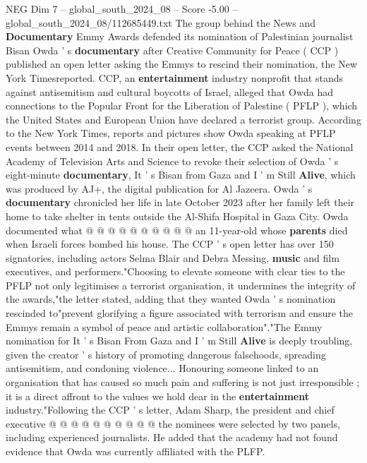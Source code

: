\begin{textsample}{NEG Dim 7 – global\_south\_2024\_08 – Score -5.00 – global\_south\_2024\_08/112685449.txt}  \label{ex:f7_neg_373}
The group behind the News and \textbf{Documentary} Emmy Awards defended its nomination of Palestinian journalist Bisan Owda ' s \textbf{documentary} after Creative Community for Peace ( CCP ) published an open letter asking the Emmys to rescind their nomination, the New York Timesreported.
CCP, an \textbf{entertainment} industry nonprofit that stands against antisemitism and cultural boycotts of Israel, alleged that Owda had connections to the Popular Front for the Liberation of Palestine ( PFLP ), which the United States and European Union have declared a terrorist group.
According to the New York Times, reports and pictures show Owda speaking at PFLP events between 2014 and 2018.
In their open letter, the CCP asked the National Academy of Television Arts and Science to revoke their selection of Owda ' s eight-minute \textbf{documentary}, It ' s Bisan from Gaza and I ' m Still \textbf{Alive}, which was produced by AJ+, the digital publication for Al Jazeera.
Owda ' s \textbf{documentary} chronicled her life in late October 2023 after her family left their home to take shelter in tents outside the Al-Shifa Hospital in Gaza City.
Owda documented what @ @ @ @ @ @ @ @ @ @ an 11-year-old whose \textbf{parents} died when Israeli forces bombed his house.
The CCP ' s open letter has over 150 signatories, including actors Selma Blair and Debra Messing, \textbf{music} and film executives, and performers."Choosing to elevate someone with clear ties to the PFLP not only legitimises a terrorist organisation, it undermines the integrity of the awards,"the letter stated, adding that they wanted Owda ' s nomination rescinded to"prevent glorifying a figure associated with terrorism and ensure the Emmys remain a symbol of peace and artistic collaboration"."The Emmy nomination for It ' s Bisan From Gaza and I ' m Still \textbf{Alive} is deeply troubling, given the creator ' s history of promoting dangerous falsehoods, spreading antisemitism, and condoning violence...
Honouring someone linked to an organisation that has caused so much pain and suffering is not just irresponsible ; it is a direct affront to the values we hold dear in the \textbf{entertainment} industry."Following the CCP ' s letter, Adam Sharp, the president and chief executive @ @ @ @ @ @ @ @ @ @ the nominees were selected by two panels, including experienced journalists.
He added that the academy had not found evidence that Owda was currently affiliated with the PLFP.

\end{textsample}
